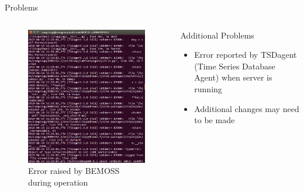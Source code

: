 \documentclass{beamer}
\begin{document}
\begin{frame}{Problems}
	\begin{columns}[T]
		\begin{column}{0.5\textwidth}
			\begin{figure}
				\includegraphics[scale=0.2]{figs/screenshot61419.png}
				\caption{Error raised by BEMOSS during operation}
			\end{figure}
		\end{column}
		\begin{column}{0.5\textwidth}
			\begin{block}{Additional Problems}
				\begin{itemize}
					\item Error reported by TSDagent (Time Series Database Agent) when server is running
					\item Additional changes may need to be made
				\end{itemize}
			\end{block}
		\end{column}
	\end{columns}
\end{frame}
\end{document}
